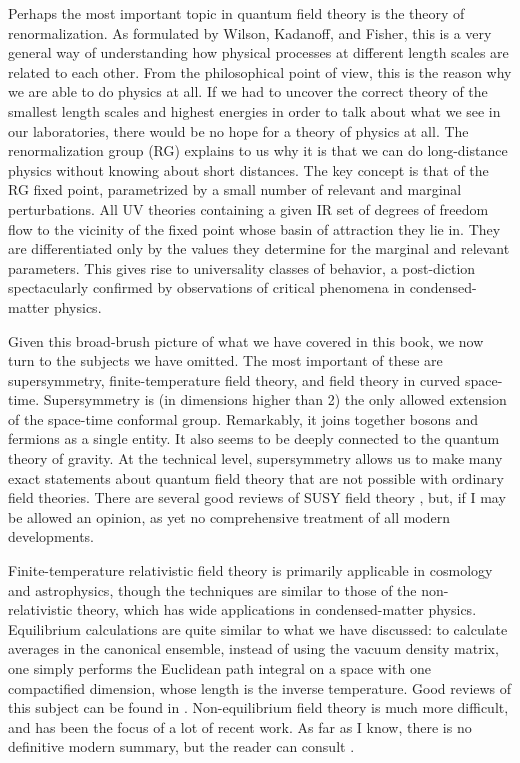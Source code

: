 Perhaps the most important topic in quantum field theory is the theory of renormalization.
As formulated by Wilson, Kadanoff, and Fisher, this is a very general way
of understanding how physical processes at different length scales are related to each
other. From the philosophical point of view, this is the reason why we are able to do
physics at all. If we had to uncover the correct theory of the smallest length scales and
highest energies in order to talk about what we see in our laboratories, there would be
no hope for a theory of physics at all. The renormalization group (RG) explains
to us why it is that we can do long-distance physics without knowing about short distances.
The key concept is that of the RG fixed point, parametrized by a small number
of relevant and marginal perturbations. All UV theories containing a given IR set of
degrees of freedom flow to the vicinity of the fixed point whose basin of attraction they
lie in. They are differentiated only by the values they determine for the marginal and
relevant parameters. This gives rise to universality classes of behavior, a post-diction
spectacularly confirmed by observations of critical phenomena in condensed-matter
physics.

Given this broad-brush picture of what we have covered in this book, we now turn
to the subjects we have omitted. The most important of these are supersymmetry,
finite-temperature field theory, and field theory in curved space-time. Supersymmetry
is (in dimensions higher than 2) the only allowed extension of the space-time conformal
group. Remarkably, it joins together bosons and fermions as a single entity. It also seems
to be deeply connected to the quantum theory of gravity. At the technical level, supersymmetry
allows us to make many exact statements about quantum field theory that are
not possible with ordinary field theories. There are several good reviews of SUSY
field theory \cite{banks-ref-152,banks-ref-153,banks-ref-154,banks-ref-155,banks-ref-156}, but, if I may be
allowed an opinion, as yet no comprehensive treatment of all modern developments.

Finite-temperature relativistic field theory is primarily applicable in cosmology and
astrophysics, though the techniques are similar to those of the non-relativistic theory,
which has wide applications in condensed-matter physics. Equilibrium calculations are
quite similar to what we have discussed: to calculate averages in the canonical ensemble,
instead of using the vacuum density matrix, one simply performs the Euclidean
path integral on a space with one compactified dimension, whose length is the inverse
temperature. Good reviews of this subject can be found in \cite{banks-ref-157}. Non-equilibrium field
theory is much more difficult, and has been the focus of a lot of recent work. As far as
I know, there is no definitive modern summary, but the reader can consult \cite{banks-ref-158}.


